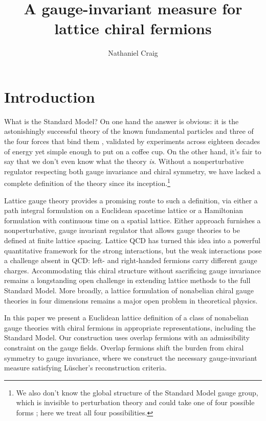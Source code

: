 \documentclass[11pt,a4paper]{article}
\title{A gauge-invariant measure for lattice chiral fermions}
\author[a,b,c]{Nathaniel Craig}
\affiliation[a]{Kavli Institute for Theoretical Physics,
  University of California,\\
  Santa Barbara, CA 93106, USA}
\affiliation[b]{Department of Physics,
  University of California,\\
  Santa Barbara, CA 93106, USA}
\affiliation[c]{OpenAI,\\
  San Francisco, CA 94158, USA}
\theoremstyle{remark}
\begin{document}
\maketitle
\flushbottom

\section{Introduction}
\label{sec:introduction}

What is the Standard Model? On one hand the answer is obvious: it is the astonishingly successful theory of the known fundamental particles and three of the four forces that bind them \cite{GlashowElectroweak,WeinbergLeptons,SalamElectroweak,FritzschGellMannLeutwyler}, validated by experiments across eighteen decades of energy yet simple enough to put on a coffee cup. On the other hand, it's fair to say that we don't even know what the theory {\it is}. Without a nonperturbative regulator respecting both gauge invariance and chiral symmetry, we have lacked a complete definition of the theory since its inception.\footnote{We also don't know the global structure of the Standard Model gauge group, which is invisible to perturbation theory and could take one of four possible forms \cite{HucksGlobal,TongGlobal}; here we treat all four possibilities.}

Lattice gauge theory provides a promising route to such a definition, via either a path integral formulation on a Euclidean spacetime lattice or a Hamiltonian formulation with continuous time on a spatial lattice. Either approach furnishes a nonperturbative, gauge invariant regulator that allows gauge theories to be defined at finite lattice spacing. Lattice QCD has turned this idea into a powerful quantitative framework for the strong interactions, but the weak interactions pose a challenge absent in QCD: left- and right-handed fermions carry different gauge charges. Accommodating this chiral structure without sacrificing gauge invariance remains a longstanding open challenge in extending lattice methods to the full Standard Model. More broadly, a lattice formulation of nonabelian chiral gauge theories in four dimensions remains a major open problem in theoretical physics.

In this paper we present a Euclidean lattice definition of a class of nonabelian gauge theories with chiral fermions in appropriate representations, including the Standard Model. Our construction uses overlap fermions with an admissibility constraint on the gauge fields. Overlap fermions shift the burden from chiral symmetry to gauge invariance, where we construct the necessary gauge-invariant measure satisfying L\"{u}scher's reconstruction criteria.
\end{document}
